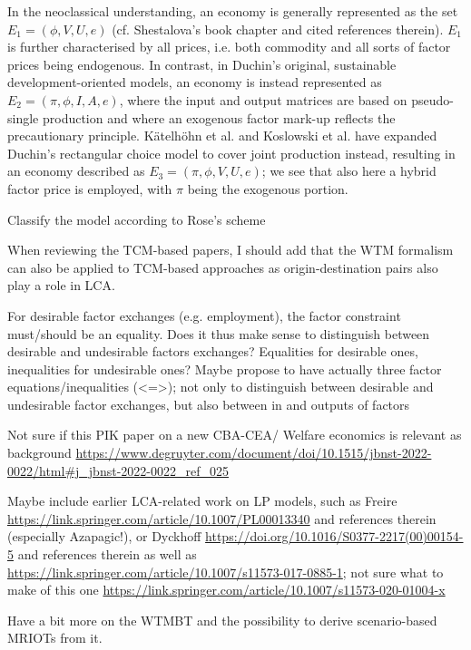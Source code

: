 \documentclass{article}
\begin{document}
\begin{refsection}
In the neoclassical understanding, an economy is generally represented as the set $E_{1} = (\phi, V, U, e)$ (cf. Shestalova's book chapter and cited references therein). $E_{1}$ is further characterised by all prices, i.e. both commodity and all sorts of factor prices being endogenous. In contrast, in Duchin's original, sustainable development-oriented models, an economy is instead represented as $E_{2} = (\pi, \phi, I, A, e)$, where the input and output matrices are based on pseudo-single production and where an exogenous factor mark-up reflects the precautionary principle. Kätelhöhn et al. and Koslowski et al. have expanded Duchin's rectangular choice model to cover joint production instead, resulting in an economy described as $E_{3} = (\pi, \phi, V, U, e)$; we see that also here a hybrid factor price is employed, with $\pi$ being the exogenous portion.

Classify the model according to Rose's scheme

When reviewing the TCM-based papers, I should add that the WTM formalism can also be applied to TCM-based approaches as origin-destination pairs also play a role in LCA.

For desirable factor exchanges (e.g. employment), the factor constraint must/should be an equality. Does it thus make sense to distinguish between desirable and undesirable factors exchanges? Equalities for desirable ones, inequalities for undesirable ones?
Maybe propose to have actually three factor equations/inequalities (<=>); not only to distinguish between desirable and undesirable factor exchanges, but also between in and outputs of factors

Not sure if this PIK paper on a new CBA-CEA/ Welfare economics is relevant as background \url{https://www.degruyter.com/document/doi/10.1515/jbnst-2022-0022/html#j_jbnst-2022-0022_ref_025}

Maybe include earlier LCA-related work on LP models, such as Freire \url{https://link.springer.com/article/10.1007/PL00013340} and references therein (especially Azapagic!), or Dyckhoff \url{https://doi.org/10.1016/S0377-2217(00)00154-5} and references therein as well as \url{https://link.springer.com/article/10.1007/s11573-017-0885-1}; not sure what to make of this one \url{https://link.springer.com/article/10.1007/s11573-020-01004-x}

Have a bit more on the WTMBT and the possibility to derive scenario-based MRIOTs from it.


\end{refsection}
\end{document}
